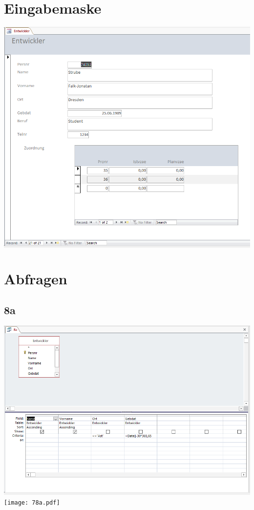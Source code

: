 \section{Eingabemaske}
\includegraphics[width=.98\columnwidth]{6.PNG}

\section{Abfragen}
\subsection{8a}
\includegraphics[width=.98\columnwidth]{78a.PNG}\\
\texttt{[image: 78a.pdf]}
